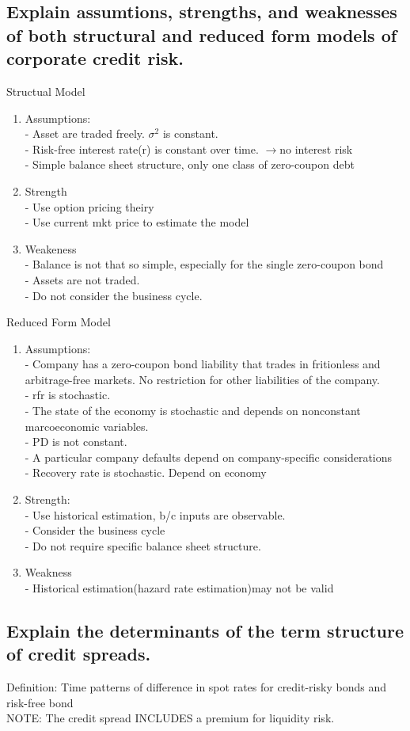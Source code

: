 \documentclass{article}
\newcommand{\be}{\begin{enumerate}}
\newcommand{\ee}{\end{enumerate}}
\newcommand{\ra}{$\rightarrow$}
\begin{document}
\subsection{Explain assumtions, strengths, and weaknesses of both structural and
reduced form models of corporate credit risk.}
Structual Model
\be
    \item Assumptions:
        \\- Asset are traded freely. $\sigma^2$ is constant.
        \\- Risk-free interest rate(r) is constant over time. \ra no interest risk
        \\- Simple balance sheet structure, only one class of zero-coupon debt
    \item Strength
        \\- Use option pricing theiry
        \\- Use current mkt price to estimate the model
    \item Weakeness
        \\- Balance is not that so simple, especially for the single zero-coupon bond
        \\- Assets are not traded.
        \\- Do not consider the business cycle.
\ee
Reduced Form Model
\be
    \item Assumptions:
    \\- Company has a zero-coupon bond liability that trades in fritionless and arbitrage-free
    markets. No restriction for other liabilities of the company.
    \\- rfr is stochastic.
    \\- The state of the economy is stochastic and depends on nonconstant marcoeconomic variables.
    \\- PD is not constant.
    \\- A particular company defaults depend on company-specific considerations
    \\- Recovery rate is stochastic. Depend on economy
    \item Strength: 
    \\- Use historical estimation, b/c inputs are observable.
    \\- Consider the business cycle
    \\- Do not require specific balance sheet structure.
    \item Weakness
    \\- Historical estimation(hazard rate estimation)may not be valid
\ee
\subsection{Explain the determinants of the term structure of credit spreads.}
Definition: Time patterns of difference in spot rates for credit-risky bonds and risk-free bond
\\NOTE: The credit spread INCLUDES a premium for liquidity risk.
\end{document}
